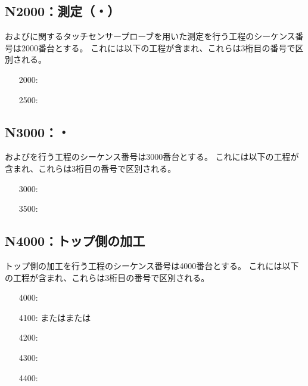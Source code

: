 \subsection{N2000：測定（\Dimple・\ReliefGroove）}
\Dimple および\ReliefGroove に関するタッチセンサープローブを用いた測定を行う工程のシーケンス番号は2000番台とする。
これには以下の工程が含まれ、これらは3桁目の番号で区別される。
\begin{enumerate}
\item[2000:] \DimpleMeasurement
\item[2500:] \ReliefGrooveMeasurement
\end{enumerate}


\subsection{N3000：\DimpleMilling ・\ReliefGrooveMilling}
\DimpleMilling および\ReliefGrooveMilling を行う工程のシーケンス番号は3000番台とする。
これには以下の工程が含まれ、これらは3桁目の番号で区別される。
\begin{enumerate}
\item[3000:] \DimpleMilling
\item[3500:] \ReliefGrooveMilling
\end{enumerate}


\subsection{N4000：トップ側の加工}
トップ側の加工を行う工程のシーケンス番号は4000番台とする。
これには以下の工程が含まれ、これらは3桁目の番号で区別される。
\begin{enumerate}
\item[4000:] \TopEndFacecutMilling
\item[4100:] \TopOutcutMilling または\EndFaceBoringMilling または\IncutBoringMilling
\item[4200:] \KeywayMilling
\item[4300:] \TopEndFaceOutCChamferMilling
\item[4400:] \TopEndFaceInCChamferMilling
\end{enumerate}



